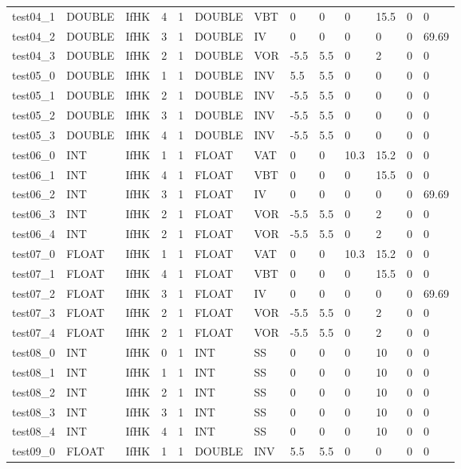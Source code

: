 \begin{longtable}{|l|l|l|p{0.5cm}|p{0.5cm}|l|p{0.5cm}|p{0.5cm}|p{0.5cm}|l|l|p{0.5cm}|l|}
test04\_1 & DOUBLE & IfHK & 4 & 1 & DOUBLE & VBT & 0 & 0 & 0 & 15.5 & 0 & 0 \\
test04\_2 & DOUBLE & IfHK & 3 & 1 & DOUBLE & IV & 0 & 0 & 0 & 0 & 0 & 69.69 \\
test04\_3 & DOUBLE & IfHK & 2 & 1 & DOUBLE & VOR & -5.5 & 5.5 & 0 & 2 & 0 & 0 \\
test05\_0 & DOUBLE & IfHK & 1 & 1 & DOUBLE & INV & 5.5 & 5.5 & 0 & 0 & 0 & 0 \\
test05\_1 & DOUBLE & IfHK & 2 & 1 & DOUBLE & INV & -5.5 & 5.5 & 0 & 0 & 0 & 0 \\
test05\_2 & DOUBLE & IfHK & 3 & 1 & DOUBLE & INV & -5.5 & 5.5 & 0 & 0 & 0 & 0 \\
test05\_3 & DOUBLE & IfHK & 4 & 1 & DOUBLE & INV & -5.5 & 5.5 & 0 & 0 & 0 & 0 \\
test06\_0 & INT & IfHK & 1 & 1 & FLOAT & VAT & 0 & 0 & 10.3 & 15.2 & 0 & 0 \\
test06\_1 & INT & IfHK & 4 & 1 & FLOAT & VBT & 0 & 0 & 0 & 15.5 & 0 & 0 \\
test06\_2 & INT & IfHK & 3 & 1 & FLOAT & IV & 0 & 0 & 0 & 0 & 0 & 69.69 \\
test06\_3 & INT & IfHK & 2 & 1 & FLOAT & VOR & -5.5 & 5.5 & 0 & 2 & 0 & 0 \\
test06\_4 & INT & IfHK & 2 & 1 & FLOAT & VOR & -5.5 & 5.5 & 0 & 2 & 0 & 0 \\
test07\_0 & FLOAT & IfHK & 1 & 1 & FLOAT & VAT & 0 & 0 & 10.3 & 15.2 & 0 & 0 \\
test07\_1 & FLOAT & IfHK & 4 & 1 & FLOAT & VBT & 0 & 0 & 0 & 15.5 & 0 & 0 \\
test07\_2 & FLOAT & IfHK & 3 & 1 & FLOAT & IV & 0 & 0 & 0 & 0 & 0 & 69.69 \\
test07\_3 & FLOAT & IfHK & 2 & 1 & FLOAT & VOR & -5.5 & 5.5 & 0 & 2 & 0 & 0 \\
test07\_4 & FLOAT & IfHK & 2 & 1 & FLOAT & VOR & -5.5 & 5.5 & 0 & 2 & 0 & 0 \\
test08\_0 & INT & IfHK & 0 & 1 & INT & SS & 0 & 0 & 0 & 10 & 0 & 0 \\
test08\_1 & INT & IfHK & 1 & 1 & INT & SS & 0 & 0 & 0 & 10 & 0 & 0 \\
test08\_2 & INT & IfHK & 2 & 1 & INT & SS & 0 & 0 & 0 & 10 & 0 & 0 \\
test08\_3 & INT & IfHK & 3 & 1 & INT & SS & 0 & 0 & 0 & 10 & 0 & 0 \\
test08\_4 & INT & IfHK & 4 & 1 & INT & SS & 0 & 0 & 0 & 10 & 0 & 0 \\
test09\_0 & FLOAT & IfHK & 1 & 1 & DOUBLE & INV & 5.5 & 5.5 & 0 & 0 & 0 & 0 \\

\end{longtable}
